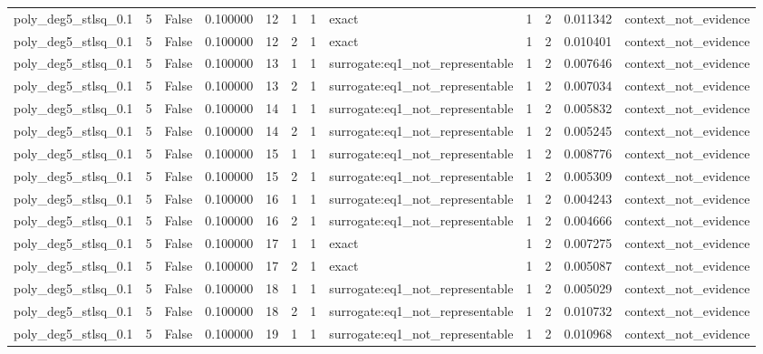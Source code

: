 \begin{tabular}{lrrrrrrlrrrl}
poly\_deg5\_stlsq\_0.1 & 5 & False & 0.100000 & 12 & 1 & 1 & exact & 1 & 2 & 0.011342 & context\_not\_evidence \\
poly\_deg5\_stlsq\_0.1 & 5 & False & 0.100000 & 12 & 2 & 1 & exact & 1 & 2 & 0.010401 & context\_not\_evidence \\
poly\_deg5\_stlsq\_0.1 & 5 & False & 0.100000 & 13 & 1 & 1 & surrogate:eq1\_not\_representable & 1 & 2 & 0.007646 & context\_not\_evidence \\
poly\_deg5\_stlsq\_0.1 & 5 & False & 0.100000 & 13 & 2 & 1 & surrogate:eq1\_not\_representable & 1 & 2 & 0.007034 & context\_not\_evidence \\
poly\_deg5\_stlsq\_0.1 & 5 & False & 0.100000 & 14 & 1 & 1 & surrogate:eq1\_not\_representable & 1 & 2 & 0.005832 & context\_not\_evidence \\
poly\_deg5\_stlsq\_0.1 & 5 & False & 0.100000 & 14 & 2 & 1 & surrogate:eq1\_not\_representable & 1 & 2 & 0.005245 & context\_not\_evidence \\
poly\_deg5\_stlsq\_0.1 & 5 & False & 0.100000 & 15 & 1 & 1 & surrogate:eq1\_not\_representable & 1 & 2 & 0.008776 & context\_not\_evidence \\
poly\_deg5\_stlsq\_0.1 & 5 & False & 0.100000 & 15 & 2 & 1 & surrogate:eq1\_not\_representable & 1 & 2 & 0.005309 & context\_not\_evidence \\
poly\_deg5\_stlsq\_0.1 & 5 & False & 0.100000 & 16 & 1 & 1 & surrogate:eq1\_not\_representable & 1 & 2 & 0.004243 & context\_not\_evidence \\
poly\_deg5\_stlsq\_0.1 & 5 & False & 0.100000 & 16 & 2 & 1 & surrogate:eq1\_not\_representable & 1 & 2 & 0.004666 & context\_not\_evidence \\
poly\_deg5\_stlsq\_0.1 & 5 & False & 0.100000 & 17 & 1 & 1 & exact & 1 & 2 & 0.007275 & context\_not\_evidence \\
poly\_deg5\_stlsq\_0.1 & 5 & False & 0.100000 & 17 & 2 & 1 & exact & 1 & 2 & 0.005087 & context\_not\_evidence \\
poly\_deg5\_stlsq\_0.1 & 5 & False & 0.100000 & 18 & 1 & 1 & surrogate:eq1\_not\_representable & 1 & 2 & 0.005029 & context\_not\_evidence \\
poly\_deg5\_stlsq\_0.1 & 5 & False & 0.100000 & 18 & 2 & 1 & surrogate:eq1\_not\_representable & 1 & 2 & 0.010732 & context\_not\_evidence \\
poly\_deg5\_stlsq\_0.1 & 5 & False & 0.100000 & 19 & 1 & 1 & surrogate:eq1\_not\_representable & 1 & 2 & 0.010968 & context\_not\_evidence \\

\end{tabular}
